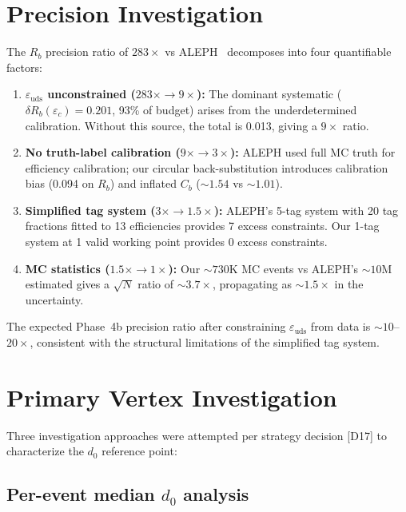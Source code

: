 \documentclass[11pt,a4paper]{article}
\begin{document}
\section{Precision Investigation}
\label{sec:precision_investigation}

The $R_b$ precision ratio of $283\times$ vs ALEPH~\cite{ALEPH:Rb:1996} decomposes
into four quantifiable factors:

\begin{enumerate}
\item \textbf{$\varepsilon_\mathrm{uds}$ unconstrained ($283\times \to 9\times$):}
The dominant systematic ($\delta R_b(\varepsilon_c) = 0.201$, 93\% of budget) arises from the
underdetermined calibration. Without this source, the total is 0.013, giving a
$9\times$ ratio.

\item \textbf{No truth-label calibration ($9\times \to 3\times$):} ALEPH used full
MC truth for efficiency calibration; our circular back-substitution introduces
calibration bias (0.094 on $R_b$) and inflated $C_b$ ($\sim 1.54$ vs $\sim 1.01$).

\item \textbf{Simplified tag system ($3\times \to 1.5\times$):} ALEPH's 5-tag system
with 20 tag fractions fitted to 13 efficiencies provides 7 excess constraints. Our
1-tag system at 1 valid working point provides 0 excess constraints.

\item \textbf{MC statistics ($1.5\times \to 1\times$):} Our $\sim 730$K MC events vs
ALEPH's $\sim 10$M estimated gives a $\sqrt{N}$ ratio of $\sim 3.7\times$,
propagating as $\sim 1.5\times$ in the uncertainty.
\end{enumerate}

The expected Phase~4b precision ratio after constraining $\varepsilon_\mathrm{uds}$
from data is $\sim 10$--$20\times$, consistent with the structural limitations
of the simplified tag system.

\section{Primary Vertex Investigation}
\label{app:vertex}

Three investigation approaches were attempted per strategy decision [D17] to
characterize the $d_0$ reference point:

\subsection{Per-event median $d_0$ analysis}
\end{document}
